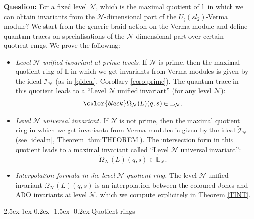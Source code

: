\documentclass[reqno,a4paper,11pt]{amsart}
\makeatletter
\numberwithin{equation}{section}
\numberwithin{figure}{section}
\theoremstyle{definition}
\theoremstyle{plain}
\renewcommand*{\subsection}{\@startsection{subsection}{2}{\z@}%
	{2.5ex \@plus 1ex \@minus 0.2ex}%
	{-1.5ex \@plus -0.2ex}%
	{\normalfont\normalsize\bfseries}}
\newcommand{\Li}{{\mathbb L}}
\newcommand{\Liq}{\mathbb L}
\newcommand{\cI}{\mathcal{I}}
\newcommand{\cN}{\mathcal{N}}
\makeatother
\begin{document}
{\bf Question:} For a fixed level $\cN$, which is the maximal quotient of $\Liq$ in which we can obtain invariants from the $\cN$-dimensional part of the $U_q(sl_2)$-Verma module?
We start from the generic braid action on the Verma module and define quantum traces on specialisations of the $\cN$-dimensional part over certain quotient rings. We prove the following:
\par
\begin{itemize}
\item[1)] {\color{blue} \em Level $\cN$ unified invariant at prime levels.} If $\cN$ is prime, then the maximal quotient ring of $\Liq$ in which we get invariants from Verma modules is given by the ideal $\cI_\cN$ (as in \eqref{qideal}, Corollary \ref{coro:prime}).
The quantum trace in this quotient leads to a 
``Level $\cN$ unified invariant'' (for any level $\cN$):
$${\color{black} \Omega_{\cN}(L)(q,s) \in \Li_{\cN}}.$$
%
\item[2)] {\color{blue} \em Level $\cN$ universal invariant.} If $\cN$ is not prime, then the maximal quotient ring in which we get invariants from Verma modules is given by the ideal $\widetilde{\cI}_{\cN}$ (see \eqref{idealm}, Theorem \ref{thm:THEOREM}). 
%
The intersection form in this quotient leads to a maximal invariant called ``Level $\cN$ universal invariant'':  $$ \widetilde{\Omega}_{\cN}(L)(q,s) \in \widetilde{\Li}_\cN.$$

\item[3)] {\color{blue} \em Interpolation formula in the level $\cN$ quotient ring.} The level $\cN$ unified invariant $\Omega_{\cN}(L)(q,s)$ is an interpolation between the coloured Jones and ADO invariants at level $\cN$, which we compute explicitely in Theorem \ref{TINT}.
\end{itemize}

\subsection{Quotient rings} 
\end{document}
